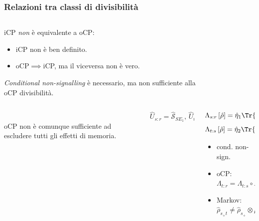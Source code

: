 \documentclass{beamer}
\begin{document}
\begin{frame}
\frametitle{Relazioni tra classi di divisibilità}
\begin{columns}
	\begin{column}{0.68\textwidth}
		iCP \emph{non} è equivalente a oCP:
		\begin{itemize}
			\item {} iCP non è ben definito.
			\item {} oCP\(\implies\)iCP, ma il viceversa non è vero.
		\end{itemize}
	\pause
	\emph{Conditional non-signalling} è necessario, ma non sufficiente alla oCP divisibilità.
	\end{column}
    \pause
	\begin{column}{0.30\textwidth}
		\begin{figure}
			\resizebox{\textwidth}{!}{}
		\end{figure}
	\end{column}
\end{columns}
\begin{columns}
	\begin{column}{0.3\textwidth}
		\\
		oCP non  è comunque sufficiente ad escludere tutti gli effetti di memoria.
	\end{column}
    \pause
	\begin{column}{0.3\textwidth}
		\begin{figure}
			\resizebox{\textwidth}{!}{}
		\end{figure}
	    \[\hat{U}_{s:r} = \hat{\mathcal{S}}_{S E_1},\, \hat{U}_{t:s} = \hat{\mathcal{S}}_{S E_2}\]
	\end{column}
    \pause
    \begin{column}{0.4\textwidth}
    	\[\Lambda_{s:r}\left[\hat{\rho}\right] = \hat{\eta}_1 \Tr{\hat{\rho}},\]
    	\[\Lambda_{t:s}\left[\hat{\rho}\right] = \hat{\eta}_2 \Tr{\hat{\rho}}  \]
    	\begin{itemize}[label={\checkmark}]
    		\item cond. non-sign.
    		\item oCP: \(\Lambda_{t\colon r} = \Lambda_{t\colon s} \circ \Lambda_{s\colon r}\)
    	\end{itemize}
	    \begin{itemize}[label={\(\times\)}]
	    	\item Markov: \(\hat{\rho}_{s_+t} \not= \hat{\rho}_{s_+} \otimes \hat{\rho}_{t}\)
	    \end{itemize}
    \end{column}
\end{columns}
\end{frame}
\end{document}
